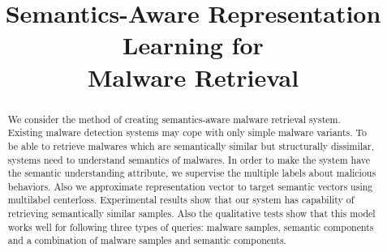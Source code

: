 \documentclass[sigconf, anonymous]{acmart}
\begin{document}
\title{Semantics-Aware Representation Learning for \\
Malware Retrieval} %

\begin{abstract}
%

We consider the method of creating semantics-aware malware retrieval system. Existing malware detection systems may cope with only simple malware variants. To be able to retrieve malwares which are semantically similar but structurally dissimilar, systems need to understand semantics of malwares. In order to make the system have the semantic understanding attribute, we supervise the multiple labels about malicious behaviors. Also we approximate representation vector to target semantic vectors using multilabel centerloss. Experimental results show that our system has capability of retrieving semantically similar samples. Also the qualitative tests show that this model works well for following three types of queries: malware samples, semantic components and a combination of malware samples and semantic components.




\end{abstract}
\end{document}
